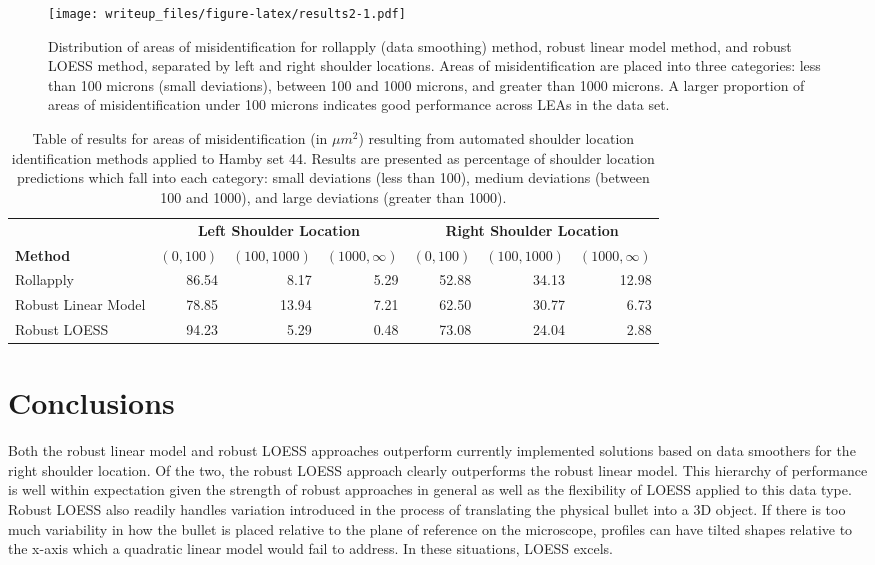\documentclass[12pt]{article}
\begin{document}
\begin{figure}
\centering
\texttt{[image: writeup\_files/figure-latex/results2-1.pdf]}
\caption{\label{results2}Distribution of areas of misidentification for
rollapply (data smoothing) method, robust linear model method, and
robust LOESS method, separated by left and right shoulder locations.
Areas of misidentification are placed into three categories: less than
100 microns (small deviations), between 100 and 1000 microns, and
greater than 1000 microns. A larger proportion of areas of
misidentification under 100 microns indicates good performance across
LEAs in the data set.}
\end{figure}

\begin{table}[]
\centering
\begin{tabular}{lrrr|rrr}
& \multicolumn{3}{c}{\textbf{Left Shoulder Location}} & \multicolumn{3}{c}{\textbf{Right Shoulder Location}} \\
\textbf{Method} & $(0,100)$ & $ (100, 1000) $ & $(1000, \infty)$ & $(0,100)$ & $ (100, 1000) $ & $(1000, \infty)$ \\ \hline
Rollapply & 86.54 & 8.17 & 5.29 & 52.88& 34.13&12.98  \\ \hline
Robust Linear Model & 78.85 & 13.94 & 7.21 & 62.50 & 30.77&6.73 \\ \hline
Robust LOESS & 94.23 & 5.29 & 0.48 & 73.08& 24.04&2.88\\ \hline
\end{tabular}
\caption{Table of results for areas of misidentification (in $\mu m^2$) resulting from automated shoulder location identification methods applied to Hamby set 44. Results are presented as percentage of shoulder location predictions which fall into each category: small deviations (less than 100), medium deviations (between 100 and 1000), and large deviations (greater than 1000).}
\label{results-table}
\end{table}

\section{Conclusions}

Both the robust linear model and robust LOESS approaches outperform
currently implemented solutions based on data smoothers for the right
shoulder location. Of the two, the robust LOESS approach clearly
outperforms the robust linear model. This hierarchy of performance is
well within expectation given the strength of robust approaches in
general as well as the flexibility of LOESS applied to this data type.
Robust LOESS also readily handles variation introduced in the process of
translating the physical bullet into a 3D object. If there is too much
variability in how the bullet is placed relative to the plane of
reference on the microscope, profiles can have tilted shapes relative to
the x-axis which a quadratic linear model would fail to address. In
these situations, LOESS excels.
\end{document}
